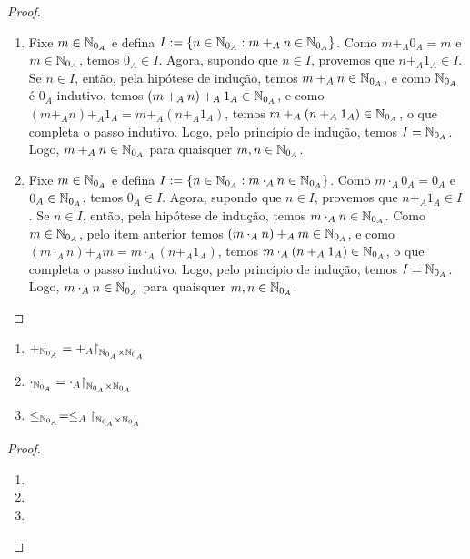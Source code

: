 \begin{proof}
    \leavevmode
        \begin{enumerate}[leftmargin=*, align=left, label=\textbf{(\alph*)}]
            \item Fixe $m \in \mathbb{N}_{0_{A}}$ e defina $I := \{n \in \mathbb{N}_{0_{A}} : m +_{A} n \in \mathbb{N}_{0_{A}}\}$. Como $m +_{A} 0_{A} = m$ e $m \in \mathbb{N}_{0_{A}}$, temos $0_{A} \in I$. Agora, supondo que $n \in I$, provemos que $n +_{A} 1_{A} \in I$. Se $n \in I$, então, pela hipótese de indução, temos $m +_{A} n \in \mathbb{N}_{0_{A}}$, e como $\mathbb{N}_{0_{A}}$ é $0_{A}$-indutivo, temos $(m +_{A} n) +_{A} 1_{A} \in \mathbb{N}_{0_{A}}$, e como $(m +_{A} n) +_{A} 1_{A} = m +_{A} (n +_{A} 1_{A})$, temos $m +_{A} (n +_{A} 1_{A}) \in \mathbb{N}_{0_{A}}$, o que completa o passo indutivo. Logo, pelo princípio de indução, temos $I = \mathbb{N}_{0_{A}}$. Logo, $m +_{A} n \in \mathbb{N}_{0_{A}}$ para quaisquer $m,n \in \mathbb{N}_{0_{A}}$.
            \item Fixe $m \in \mathbb{N}_{0_{A}}$ e defina $I := \{n \in \mathbb{N}_{0_{A}} : m \cdot_{A} n \in \mathbb{N}_{0_{A}}\}$. Como $m \cdot_{A} 0_{A} = 0_{A}$ e $0_{A} \in \mathbb{N}_{0_{A}}$, temos $0_{A} \in I$. Agora, supondo que $n \in I$, provemos que $n +_{A} 1_{A} \in I$. Se $n \in I$, então, pela hipótese de indução, temos $m \cdot_{A} n \in \mathbb{N}_{0_{A}}$. Como $m \in \mathbb{N}_{0_{A}}$, pelo item anterior temos $(m \cdot_{A} n) +_{A} m \in \mathbb{N}_{0_{A}}$, e como $(m \cdot_{A} n) +_{A} m = m \cdot_{A} (n +_{A} 1_{A})$, temos $m \cdot_{A} (n +_{A} 1_{A}) \in \mathbb{N}_{0_{A}}$, o que completa o passo indutivo. Logo, pelo princípio de indução, temos $I = \mathbb{N}_{0_{A}}$. Logo, $m \cdot_{A} n \in \mathbb{N}_{0_{A}}$ para quaisquer $m,n \in \mathbb{N}_{0_{A}}$.
        \end{enumerate}
\end{proof}

\begin{corollary}
    \leavevmode
        \begin{enumerate}[leftmargin=*, align=left, label=\textbf{(\alph*)}]
            \item $+_{\N_{0_{A}}} = +_{A} \restriction_{\N_{0_{A}} \times \N_{0_{A}}}$
            \item $\cdot_{\N_{0_{A}}} = \cdot_{A} \restriction_{\N_{0_{A}} \times \N_{0_{A}}}$
            \item $\leq_{\N_{0_{A}}} = \leq_{A} \restriction_{\N_{0_{A}} \times \N_{0_{A}}}$
        \end{enumerate}
\end{corollary}

\begin{proof}
    \leavevmode
        \begin{enumerate}[leftmargin=*, align=left, label=\textbf{(\alph*)}]
            \item \blackproof
            \item \blackproof
            \item \blackproof
        \end{enumerate}
\end{proof}

